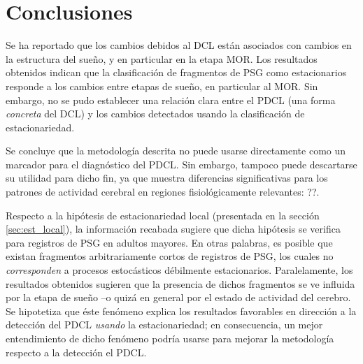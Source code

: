 \section{Conclusiones}

Se ha reportado que los cambios debidos al DCL están asociados con cambios en la estructura del sueño, y en particular en la etapa MOR.
%
Los resultados obtenidos indican que la clasificación de fragmentos de PSG como estacionarios responde a los cambios entre etapas de sueño, en particular al MOR.
%
Sin embargo, no se pudo establecer una relación clara entre el PDCL (una forma \textit{concreta} del DCL) y los cambios detectados usando la clasificación de estacionariedad.

Se concluye que la metodología descrita no puede usarse directamente como un marcador para el diagnóstico del PDCL.
%
Sin embargo, tampoco puede descartarse su utilidad para dicho fin, ya que muestra diferencias significativas para los patrones de actividad cerebral en regiones fisiológicamente relevantes: ??.


Respecto a la hipótesis de estacionariedad local (presentada en la sección \ref{sec:est_local}), la información recabada sugiere que dicha hipótesis se verifica para registros de PSG en adultos mayores.
%
En otras palabras, es posible que existan fragmentos arbitrariamente cortos de registros de PSG, los cuales no \textit{corresponden} a procesos estocásticos débilmente estacionarios.
%
Paralelamente, los resultados obtenidos sugieren que la presencia de dichos fragmentos se ve influida por la etapa de sueño --o quizá en general por el estado de actividad del cerebro.
%
Se hipotetiza que éste fenómeno explica los resultados {favorables} en dirección a la detección del PDCL \textit{usando} la estacionariedad; en consecuencia, un mejor entendimiento de dicho fenómeno podría usarse para mejorar la metodología respecto a la detección el PDCL.
%




